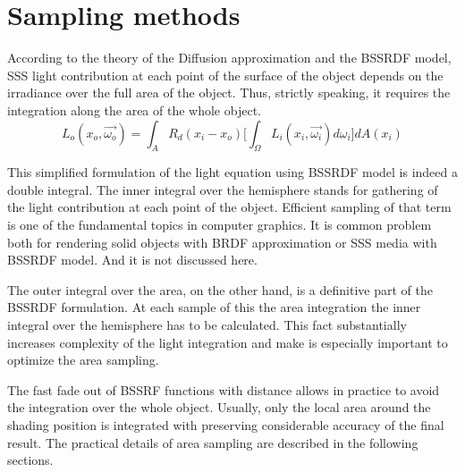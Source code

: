 \section{Sampling methods}
\label{sampling_methods}

According to the theory of the Diffusion approximation and the BSSRDF model, SSS light
contribution at each point of the surface of the object depends on the irradiance over the full area
of the object. Thus, strictly speaking, it requires the integration along the area of the whole
object.
\[
L_o(x_o, \vec{\omega_o})= \int_{A} R_d(x_i-x_o) \Bigg[ \int_{\Omega}
L_i(x_i,\vec{\omega_i})d\omega_i \Bigg] dA(x_i)
\]

This simplified formulation of the light equation using BSSRDF model is indeed a double integral.
The inner integral over the hemisphere stands for gathering of the light contribution at each point
of the object. Efficient sampling of that term is one of the fundamental topics in computer
graphics. It is common problem both for rendering solid objects with BRDF approximation or SSS media
with BSSRDF model. And it is not discussed here.

The outer integral over the area, on the other hand, is a definitive part of the BSSRDF formulation.
At each sample of this the area integration the inner integral over the hemisphere has to be
calculated. This fact substantially increases complexity of the light integration and make is
especially important to optimize the area sampling.

The fast fade out of BSSRF functions with distance allows in practice to avoid the integration over
the whole object. Usually, only the local area around the shading position is integrated with
preserving considerable accuracy of the final result. The practical details of area sampling are
described in the following sections.

